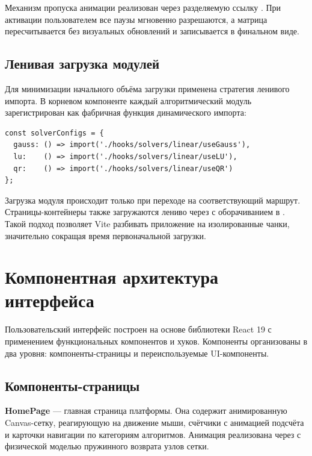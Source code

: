 \documentclass[12pt, oneside]{book}
\begin{document}
    \quad Механизм пропуска анимации реализован через разделяемую ссылку \texttt{}. При активации пользователем все паузы мгновенно разрешаются, а матрица пересчитывается без визуальных обновлений и записывается в финальном виде.

\subsection{Ленивая загрузка модулей}

    \quad Для минимизации начального объёма загрузки применена стратегия ленивого импорта. В корневом компоненте \texttt{} каждый алгоритмический модуль зарегистрирован как фабричная функция динамического импорта:

\begin{verbatim}
const solverConfigs = {
  gauss: () => import('./hooks/solvers/linear/useGauss'),
  lu:    () => import('./hooks/solvers/linear/useLU'),
  qr:    () => import('./hooks/solvers/linear/useQR')
};
\end{verbatim}

    \quad Загрузка модуля происходит только при переходе на соответствующий маршрут. Страницы-контейнеры также загружаются лениво через \texttt{} с оборачиванием в \texttt{}. Такой подход позволяет Vite разбивать приложение на изолированные чанки, значительно сокращая время первоначальной загрузки.

\section{Компонентная архитектура интерфейса}

    \quad Пользовательский интерфейс построен на основе библиотеки React 19 с применением функциональных компонентов и хуков. Компоненты организованы в два уровня: компоненты-страницы и переиспользуемые UI-компоненты.

\subsection{Компоненты-страницы}

    \quad \textbf{HomePage} --- главная страница платформы. Она содержит анимированную Canvas-сетку, реагирующую на движение мыши, счётчики с анимацией подсчёта и карточки навигации по категориям алгоритмов. Анимация реализована через \texttt{} с физической моделью пружинного возврата узлов сетки.
\end{document}

